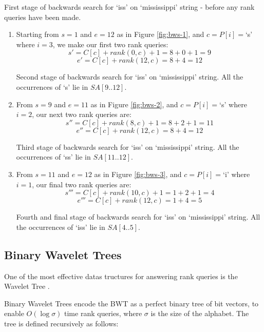 \clearpage			
			{First stage of backwards search for `iss' on `mississippi'
			 string - before any rank queries have been made.}

\begin{enumerate}
	\item
		Starting from $s = 1$ and $e = 12$ as in Figure \ref{fig:bws-1},
		and $c = P[i] = $`s' where $i = 3$, we make our first two rank queries:
			$$s' = C[c] + rank(0, c) + 1 = 8 + 0 + 1 = 9$$
			$$e' = C[c] + rank(12, c) = 8 + 4 = 12$$
		
				{Second stage of backwards search for `iss' on `mississippi'
				string. All the occurrences of `s' lie in $SA[9..12]$.}
\clearpage				
	\item
		From $s = 9$ and $e = 11$ as in Figure \ref{fig:bws-2},
		and $c = P[i] = $`s' where $i = 2$, our next two rank queries are:
			$$s'' = C[c] + rank(8, c) + 1 = 8 + 2 + 1 = 11$$
			$$e'' = C[c] + rank(12, c) = 8 + 4 = 12$$
	
			
				{Third stage of backwards search for `iss' on `mississippi'
				string. All the occurrences of `ss' lie in $SA[11..12]$.}
	
	\item
		From $s = 11$ and $e = 12$ as in Figure \ref{fig:bws-3},
		and $c = P[i] = $`i' where $i = 1$, our final two rank queries are:
			$$s''' = C[c] + rank(10, c) + 1 = 1 + 2 + 1 = 4$$
			$$e''' = C[c] + rank(12, c) = 1 + 4 = 5$$
			
			
				{Fourth and final stage of backwards search for `iss' on
				`mississippi' string. All the occurrences of `iss' lie in
				$SA[4..5]$.}
				
\end{enumerate}

\clearpage
\subsection{Binary Wavelet Trees}
One of the most effective datas tructures for answering rank queries is the Wavelet Tree \cite{claude2008, ferragina2009, ferragina2007, grossi2003, makinen2007a}.

Binary Wavelet Trees encode the BWT as a perfect binary tree of bit vectors, to 
enable $O(\log \sigma)$ time rank queries, where $\sigma$ is the size of the alphabet. The tree is defined recursively as follows:

